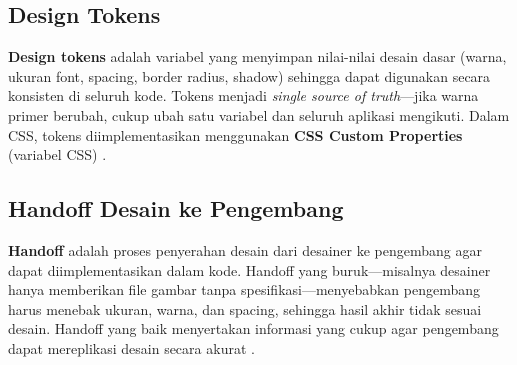 \subsection{Design Tokens}

\textbf{Design tokens} adalah variabel yang menyimpan nilai-nilai desain dasar (warna, ukuran font, spacing, border radius, shadow) sehingga dapat digunakan secara konsisten di seluruh kode. Tokens menjadi \textit{single source of truth}---jika warna primer berubah, cukup ubah satu variabel dan seluruh aplikasi mengikuti. Dalam CSS, tokens diimplementasikan menggunakan \textbf{CSS Custom Properties} (variabel CSS) \cite{mdnCss}.


\subsection{Handoff Desain ke Pengembang}

\textbf{Handoff} adalah proses penyerahan desain dari desainer ke pengembang agar dapat diimplementasikan dalam kode. Handoff yang buruk---misalnya desainer hanya memberikan file gambar tanpa spesifikasi---menyebabkan pengembang harus menebak ukuran, warna, dan spacing, sehingga hasil akhir tidak sesuai desain. Handoff yang baik menyertakan informasi yang cukup agar pengembang dapat mereplikasi desain secara akurat \cite{figmaDocs}.

